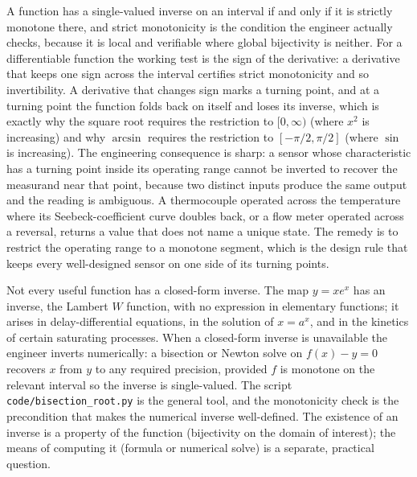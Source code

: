\begin{mastery}
A function has a single-valued inverse on an interval if and only if
it is strictly monotone there, and strict monotonicity is the
condition the engineer actually checks, because it is local and
verifiable where global bijectivity is neither. For a differentiable
function the working test is the sign of the derivative: a derivative
that keeps one sign across the interval certifies strict monotonicity
and so invertibility. A derivative that changes sign marks a turning
point, and at a turning point the function folds back on itself and
loses its inverse, which is exactly why the square root requires the
restriction to $[0, \infty)$ (where $x^{2}$ is increasing) and why
$\arcsin$ requires the restriction to $[-\pi/2, \pi/2]$ (where $\sin$
is increasing). The engineering consequence is sharp: a sensor whose
characteristic has a turning point inside its operating range cannot
be inverted to recover the measurand near that point, because two
distinct inputs produce the same output and the reading is ambiguous.
A thermocouple operated across the temperature where its
Seebeck-coefficient curve doubles back, or a flow meter operated
across a reversal, returns a value that does not name a unique state.
The remedy is to restrict the operating range to a monotone segment,
which is the design rule that keeps every well-designed sensor on one
side of its turning points.
\end{mastery}

\begin{mastery}
Not every useful function has a closed-form inverse. The map $y = x
e^{x}$ has an inverse, the Lambert $W$ function, with no expression in
elementary functions; it arises in delay-differential equations, in
the solution of $x = a^{x}$, and in the kinetics of certain
saturating processes. When a closed-form inverse is unavailable the
engineer inverts numerically: a bisection or Newton solve on
$f(x) - y = 0$ recovers $x$ from $y$ to any required precision,
provided $f$ is monotone on the relevant interval so the inverse is
single-valued. The script \texttt{code/bisection\_root.py} is the
general tool, and the monotonicity check is the precondition that
makes the numerical inverse well-defined. The existence of an inverse
is a property of the function (bijectivity on the domain of
interest); the means of computing it (formula or numerical solve) is
a separate, practical question.
\end{mastery}

